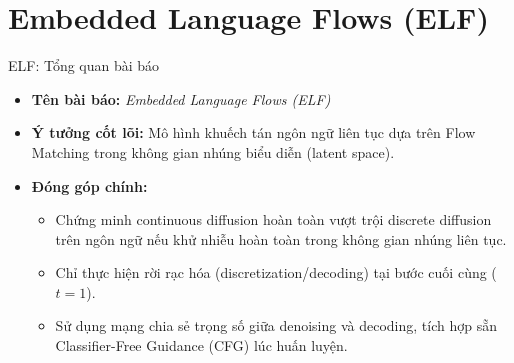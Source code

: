 
\section{Embedded Language Flows (ELF)}

\begin{frame}{ELF: Tổng quan bài báo}
    \begin{itemize}
        \item \textbf{Tên bài báo:} \textit{Embedded Language Flows (ELF)}
        \item \textbf{Ý tưởng cốt lõi:} Mô hình khuếch tán ngôn ngữ liên tục dựa trên Flow Matching trong không gian nhúng biểu diễn (latent space).
        \item \textbf{Đóng góp chính:}
        \begin{itemize}
            \item Chứng minh continuous diffusion hoàn toàn vượt trội discrete diffusion trên ngôn ngữ nếu khử nhiễu hoàn toàn trong không gian nhúng liên tục.
            \item Chỉ thực hiện rời rạc hóa (discretization/decoding) tại bước cuối cùng ($t = 1$).
            \item Sử dụng mạng chia sẻ trọng số giữa denoising và decoding, tích hợp sẵn Classifier-Free Guidance (CFG) lúc huấn luyện.
        \end{itemize}
    \end{itemize}
\end{frame}

